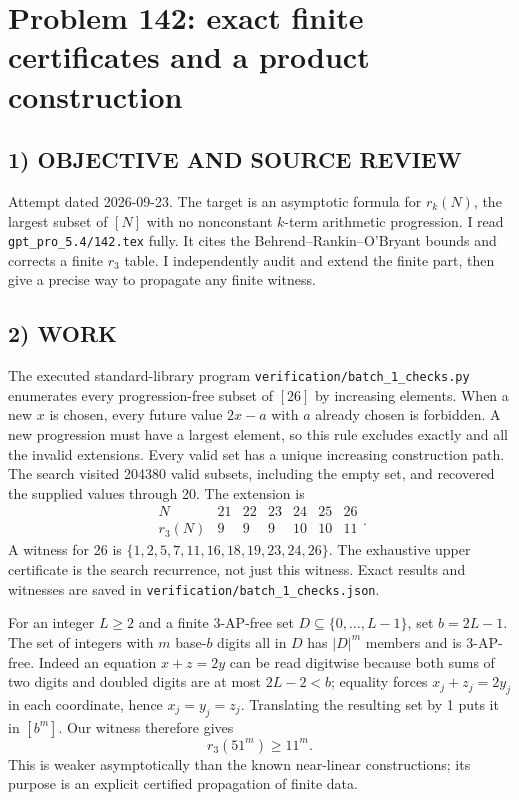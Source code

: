 \section{Problem 142: exact finite certificates and a product construction}
\subsection*{1) OBJECTIVE AND SOURCE REVIEW}
Attempt dated 2026-09-23. The target is an asymptotic formula for $r_k(N)$, the largest subset of $[N]$ with no nonconstant $k$-term arithmetic progression. I read \texttt{gpt\_pro\_5.4/142.tex} fully. It cites the Behrend--Rankin--O'Bryant bounds and corrects a finite $r_3$ table. I independently audit and extend the finite part, then give a precise way to propagate any finite witness.
\subsection*{2) WORK}
The executed standard-library program \texttt{verification/batch\_1\_checks.py} enumerates every progression-free subset of $[26]$ by increasing elements. When a new $x$ is chosen, every future value $2x-a$ with $a$ already chosen is forbidden. A new progression must have a largest element, so this rule excludes exactly and all the invalid extensions. Every valid set has a unique increasing construction path. The search visited 204380 valid subsets, including the empty set, and recovered the supplied values through 20. The extension is
\[
\begin{array}{c|rrrrrr}N&21&22&23&24&25&26\\\hline
r_3(N)&9&9&9&10&10&11\end{array}.
\]
A witness for 26 is $\{1,2,5,7,11,16,18,19,23,24,26\}$. The exhaustive upper certificate is the search recurrence, not just this witness. Exact results and witnesses are saved in \texttt{verification/batch\_1\_checks.json}.

For an integer $L\ge2$ and a finite 3-AP-free set $D\subseteq\{0,\ldots,L-1\}$, set $b=2L-1$. The set of integers with $m$ base-$b$ digits all in $D$ has $|D|^m$ members and is 3-AP-free. Indeed an equation $x+z=2y$ can be read digitwise because both sums of two digits and doubled digits are at most $2L-2<b$; equality forces $x_j+z_j=2y_j$ in each coordinate, hence $x_j=y_j=z_j$. Translating the resulting set by 1 puts it in $[b^m]$. Our witness therefore gives
\[
r_3(51^m)\ge11^m.
\]
This is weaker asymptotically than the known near-linear constructions; its purpose is an explicit certified propagation of finite data.
